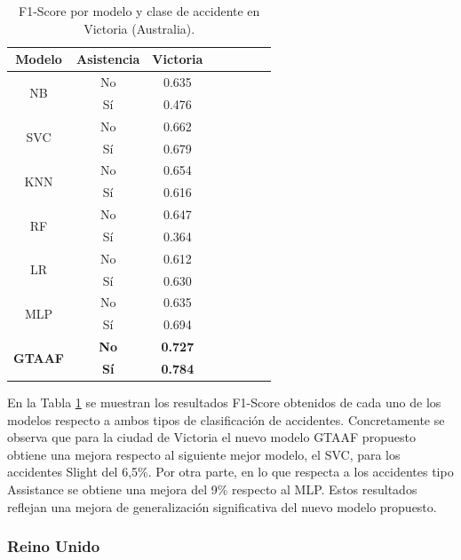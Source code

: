 \documentclass{uathesis-es}
\begin{document}
{\begin{table}[H]
\begin{center}
\begin{tabular}{|c|c||c|c|c|c|c|c|}
        \textbf{Modelo} & \textbf{Asistencia} & Victoria
        \\ \hline \hline

        \multirow{2}{*}{NB} &
            No &  0.635 \\ &
            Sí & 0.476 \\ \hline \hline
        \multirow{2}{*}{SVC} &
            No & 0.662 \\ &
            Sí &  0.679 \\ \hline \hline
        \multirow{2}{*}{KNN} &
            No  & 0.654 \\ &
            Sí & 0.616 \\ \hline \hline
        \multirow{2}{*}{RF} &
            No & 0.647 \\ &
            Sí & 0.364  \\ \hline \hline
        \multirow{2}{*}{LR} &
            No &  0.612 \\ &
            Sí & 0.630 \\ \hline \hline
        \multirow{2}{*}{MLP} &
            No & 0.635 \\ &
            Sí & 0.694 \\ \hline \hline
        \multirow{2}{*}{\textbf{GTAAF}} &
            \textbf{No} & \textbf{0.727} \\ &
            \textbf{Sí} & \textbf{0.784} \\ \hline \hline
        \end{tabular}
    \end{center}
    \caption{F1-Score por modelo y clase de accidente en Victoria (Australia).}
    \label{AustraliaMetrics}
\end{table}

En la Tabla \ref{AustraliaMetrics} se muestran los resultados F1-Score obtenidos de cada uno de los modelos respecto a ambos tipos de clasificación de accidentes. Concretamente se observa que para la ciudad de Victoria el nuevo modelo GTAAF propuesto obtiene una mejora respecto al siguiente mejor modelo, el SVC, para los accidentes Slight del 6,5\%. Por otra parte, en lo que respecta a los accidentes tipo Assistance se obtiene una mejora del 9\% respecto al MLP. Estos resultados reflejan una mejora de generalización significativa del nuevo modelo propuesto.


\subsubsection*{Reino Unido}

}
\end{document}
